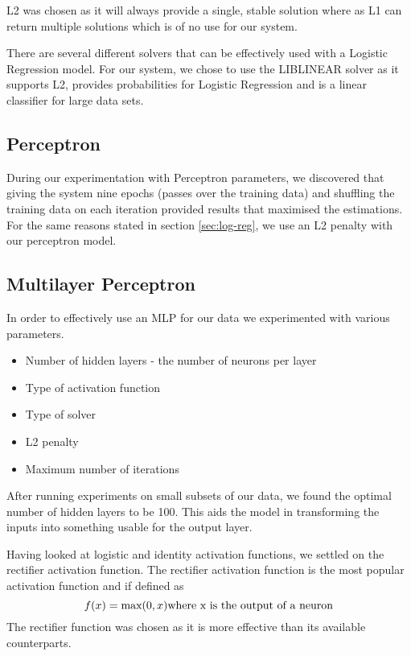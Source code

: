 \documentclass[bsc,frontabs,twoside,singlespacing,parskip,deptreport]{infthesis}     %
\begin{document}
 L2 was chosen as it will always provide a single, stable solution where as L1 can return multiple solutions
 which is of no use for our system.

 There are several different solvers that can be effectively used with a Logistic Regression model.
 For our system, we chose to use the LIBLINEAR solver as it supports L2, provides probabilities
 for Logistic Regression and is a linear classifier for large data sets\cite{fan2008liblinear}.
 
 \subsection{Perceptron}
 During our experimentation with Perceptron parameters, we discovered that giving the system nine epochs (passes
 over the training data) and shuffling the training data on each iteration provided results that maximised the
 estimations. For the same reasons stated in section \ref{sec:log-reg}, we use an L2 penalty with our perceptron
 model.
 
 \subsection{Multilayer Perceptron}
 In order to effectively use an MLP for our data we experimented with various parameters.
 \begin{itemize}
 \item Number of hidden layers - the number of neurons per layer
 \item Type of activation function
 \item Type of solver
 \item L2 penalty
 \item Maximum number of iterations
 \end{itemize}
 
 After running experiments on  small subsets of our data, we found the optimal number of hidden layers to be 100. 
 This aids the model in transforming the inputs into something usable for the output layer.
 
 Having looked at logistic and identity activation functions, we settled on the rectifier activation function.
 The rectifier activation function is the most popular activation function \cite{lecun2015deep} and if defined as
 \begin{equation}
   f(x) = \text{max}(0,x)\nonumber\\
   \text{\\where x is the output of a neuron}\nonumber
 \end{equation}
 The rectifier function was chosen as it is more effective than its available counterparts\cite{glorot2011deep}.
\end{document}
